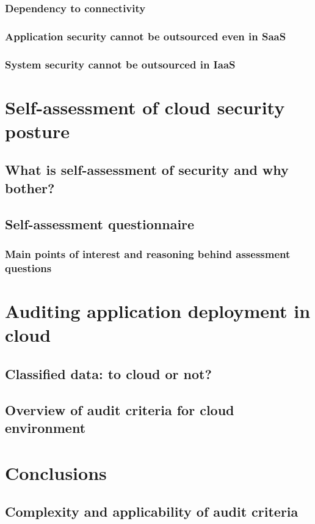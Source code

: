 \documentclass{article}
\begin{document}
\subsubsection{Dependency to connectivity}
\blindtext[2]
\subsubsection{Application security cannot be outsourced even in SaaS}
\blindtext[2]
\subsubsection{System security cannot be outsourced in IaaS}
\blindtext[2]
\section{Self-assessment of cloud security posture}
\blindtext[2]
\subsection{What is self-assessment of security and why bother?}
\blindtext[2]
\subsection{Self-assessment questionnaire}
\blindtext[2]
\subsubsection{Main points of interest and reasoning behind assessment questions}
\blindtext[2]
\section{Auditing application deployment in cloud}
\blindtext[2]
\subsection{Classified data: to cloud or not?}
\blindtext[2]
\subsection{Overview of audit criteria for cloud environment}
\blindtext[2]
\section{Conclusions}
\blindtext[2]
\subsection{Complexity and applicability of audit criteria}
\blindtext[2]
\end{document}
